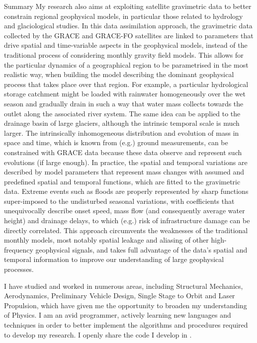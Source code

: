 \begin{cvtext}{Summary}
My research also aims at exploiting satellite gravimetric data to better constrain regional geophysical models, in particular those related to hydrology and glaciological studies.
In this data assimilation approach, the gravimetric data collected by the \ac{GRACE} and \ac{GRACE-FO} satellites are linked to parameters that drive spatial and time-variable aspects in the geophysical models, instead of the traditional process of considering monthly gravity field models.
This allows for the particular dynamics of a geographical region to be parametrised in the most realistic way, when building the model describing the dominant geophysical process that takes place over that region.
For example, a particular hydrological storage catchment might be loaded with rainwater homogeneously over the wet season and gradually drain in such a way that water mass collects towards the outlet along the associated river system.
The same idea can be applied to the drainage basin of large glaciers, although the intrinsic temporal scale is much larger.
The intrinsically inhomogeneous distribution and evolution of mass in space and time, which is known from (\ac{e.g.}) ground measurements, can be constrained with \ac{GRACE} data because these data observe and represent such evolutions (if large enough).
In practice, the spatial and temporal variations are described by model parameters that represent mass changes with assumed and predefined spatial and temporal functions, which are fitted to the gravimetric data. 
Extreme events such as floods are properly represented by sharp functions super-imposed to the undisturbed seasonal variations, with coefficients that unequivocally describe onset speed, mass flow (and consequently average water height) and drainage delays, to which (\ac{e.g.}) risk of infrastructure damage can be directly correlated.
This approach circumvents the weaknesses of the traditional monthly models, most notably spatial leakage and aliasing of other high-frequency geophysical signals, and takes full advantage of the data's spatial and temporal information to improve our understanding of large geophysical processes. 

I have studied and worked in numerous areas, including Structural Mechanics, Aerodynamics, Preliminary Vehicle Design, Single Stage to Orbit and Laser Propulsion, which have given me the opportunity to broaden my understanding of Physics.
I am an avid programmer, actively learning new languages and techniques in order to better implement the algorithms and procedures required to develop my research.
I openly share the code I develop in .

\end{cvtext}